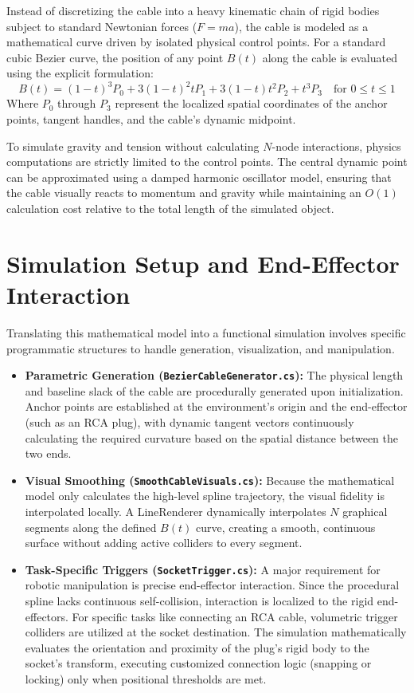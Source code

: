 \documentclass[a4paper,12pt]{report}
\begin{document}
Instead of discretizing the cable into a heavy kinematic chain of rigid bodies subject to standard Newtonian forces ($F=ma$), the cable is modeled as a mathematical curve driven by isolated physical control points. For a standard cubic Bezier curve, the position of any point $B(t)$ along the cable is evaluated using the explicit formulation:
$$B(t) = (1-t)^3 P_0 + 3(1-t)^2 t P_1 + 3(1-t) t^2 P_2 + t^3 P_3 \quad \text{for } 0 \le t \le 1$$
Where $P_0$ through $P_3$ represent the localized spatial coordinates of the anchor points, tangent handles, and the cable's dynamic midpoint. 

To simulate gravity and tension without calculating $N$-node interactions, physics computations are strictly limited to the control points. The central dynamic point can be approximated using a damped harmonic oscillator model, ensuring that the cable visually reacts to momentum and gravity while maintaining an $O(1)$ calculation cost relative to the total length of the simulated object.

\section{Simulation Setup and End-Effector Interaction}
Translating this mathematical model into a functional simulation involves specific programmatic structures to handle generation, visualization, and manipulation.

\begin{itemize}
    \item \textbf{Parametric Generation (\texttt{BezierCableGenerator.cs}):} The physical length and baseline slack of the cable are procedurally generated upon initialization. Anchor points are established at the environment's origin and the end-effector (such as an RCA plug), with dynamic tangent vectors continuously calculating the required curvature based on the spatial distance between the two ends.
    \item \textbf{Visual Smoothing (\texttt{SmoothCableVisuals.cs}):} Because the mathematical model only calculates the high-level spline trajectory, the visual fidelity is interpolated locally. A LineRenderer dynamically interpolates $N$ graphical segments along the defined $B(t)$ curve, creating a smooth, continuous surface without adding active colliders to every segment.
    \item \textbf{Task-Specific Triggers (\texttt{SocketTrigger.cs}):} A major requirement for robotic manipulation is precise end-effector interaction. Since the procedural spline lacks continuous self-collision, interaction is localized to the rigid end-effectors. For specific tasks like connecting an RCA cable, volumetric trigger colliders are utilized at the socket destination. The simulation mathematically evaluates the orientation and proximity of the plug's rigid body to the socket's transform, executing customized connection logic (snapping or locking) only when positional thresholds are met.
\end{itemize}
\end{document}
